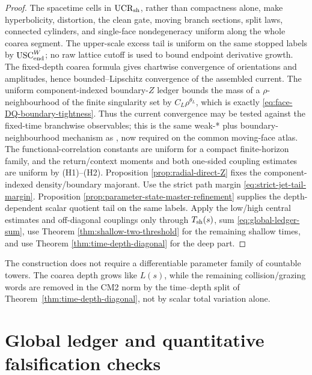 \documentclass[11pt]{article}
\begin{document}
\begin{proof}
The spacetime cells in $\mathrm{UCR}_{\rm sh}$, rather than compactness alone, make
hyperbolicity, distortion, the clean gate, moving branch sections, split
laws, connected cylinders, and single-face nondegeneracy uniform along the
whole coarea segment.  The
upper-scale excess tail is uniform on the same stopped labels by
$\mathrm{USC}_{\rm end}^{W}$; no raw lattice cutoff is used to bound endpoint
derivative growth.  The
fixed-depth coarea formula gives chartwise convergence of orientations and
amplitudes, hence bounded--Lipschitz convergence of the assembled current.
The uniform component-indexed boundary-$Z$ ledger bounds the mass of a
$\rho$-neighbourhood of the finite singularity set by
$C_L\rho^{\theta_L}$, which is exactly
\eqref{eq:face-DQ-boundary-tightness}.  Thus the current convergence may be
tested against the fixed-time branchwise observables; this is the same
weak-* plus boundary-neighbourhood mechanism as
\cite[Lemma~5.4]{CanestrariHoles}, now required on the common moving-face
atlas.  The
functional-correlation constants are uniform for a compact finite-horizon
family, and the return/context moments and both one-sided coupling estimates
are uniform by \textup{(H1)--(H2)}.  Proposition
\ref{prop:radial-direct-Z} fixes the component-indexed density/boundary
majorant.  Use the strict path margin
\eqref{eq:strict-jet-tail-margin}.  Proposition
\ref{prop:parameter-state-master-refinement} supplies the
depth-dependent scalar quotient tail on the same labels.  Apply the low/high
central estimates and off-diagonal couplings only through $T_{\rm sh}(s)$,
sum \eqref{eq:global-ledger-sum}, use Theorem
\ref{thm:shallow-two-threshold} for the remaining shallow times, and use Theorem
\ref{thm:time-depth-diagonal} for the deep part.
\end{proof}

The construction does not require a differentiable parameter family of
countable towers.  The coarea depth grows like $L(s)$, while the remaining
collision/grazing words are removed in the CM2 norm by the time--depth split
of Theorem~\ref{thm:time-depth-diagonal}, not by scalar total variation alone.

\section{Global ledger and quantitative falsification checks}
\end{document}
